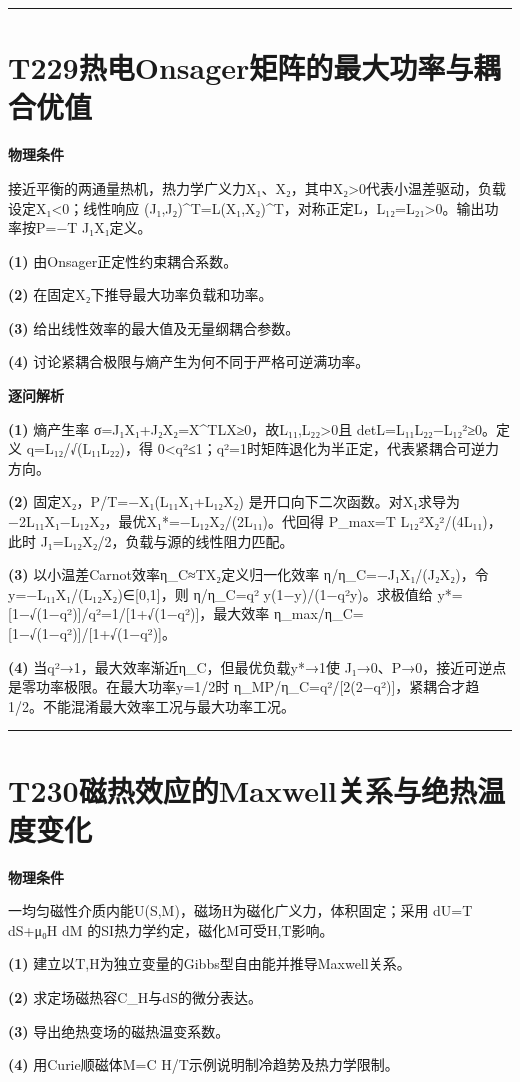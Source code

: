 \documentclass[UTF8,a4paper,11pt,oneside,openany]{ctexbook}
\begin{document}
\par\bigskip\hrule\bigskip
\section*{T229\quad 热电Onsager矩阵的最大功率与耦合优值}
\textbf{物理条件}\par 接近平衡的两通量热机，热力学广义力X₁、X₂，其中X₂>0代表小温差驱动，负载设定X₁<0；线性响应 (J₁,J₂)\textasciicircum{}T=L(X₁,X₂)\textasciicircum{}T，对称正定L，L₁₂=L₂₁>0。输出功率按P=−T J₁X₁定义。
\par\noindent\textbf{(1)} 由Onsager正定性约束耦合系数。
\par\noindent\textbf{(2)} 在固定X₂下推导最大功率负载和功率。
\par\noindent\textbf{(3)} 给出线性效率的最大值及无量纲耦合参数。
\par\noindent\textbf{(4)} 讨论紧耦合极限与熵产生为何不同于严格可逆满功率。

\par\medskip\noindent\textbf{逐问解析}
\par\noindent\textbf{(1)} 熵产生率 σ=J₁X₁+J₂X₂=X\textasciicircum{}TLX≥0，故L₁₁,L₂₂>0且 detL=L₁₁L₂₂−L₁₂²≥0。定义 q=L₁₂/√(L₁₁L₂₂)，得 0<q²≤1；q²=1时矩阵退化为半正定，代表紧耦合可逆力方向。
\par\noindent\textbf{(2)} 固定X₂，P/T=−X₁(L₁₁X₁+L₁₂X₂) 是开口向下二次函数。对X₁求导为−2L₁₁X₁−L₁₂X₂，最优X₁*=−L₁₂X₂/(2L₁₁)。代回得 P\_max=T L₁₂²X₂²/(4L₁₁)，此时 J₁=L₁₂X₂/2，负载与源的线性阻力匹配。
\par\noindent\textbf{(3)} 以小温差Carnot效率η\_C≈TX₂定义归一化效率 η/η\_C=−J₁X₁/(J₂X₂)，令 y=−L₁₁X₁/(L₁₂X₂)∈[0,1]，则 η/η\_C=q² y(1−y)/(1−q²y)。求极值给 y*=[1−√(1−q²)]/q²=1/[1+√(1−q²)]，最大效率 η\_max/η\_C=[1−√(1−q²)]/[1+√(1−q²)]。
\par\noindent\textbf{(4)} 当q²→1，最大效率渐近η\_C，但最优负载y*→1使 J₁→0、P→0，接近可逆点是零功率极限。在最大功率y=1/2时 η\_MP/η\_C=q²/[2(2−q²)]，紧耦合才趋1/2。不能混淆最大效率工况与最大功率工况。

\par\bigskip\hrule\bigskip
\section*{T230\quad 磁热效应的Maxwell关系与绝热温度变化}
\textbf{物理条件}\par 一均匀磁性介质内能U(S,M)，磁场H为磁化广义力，体积固定；采用 dU=T dS+μ₀H dM 的SI热力学约定，磁化M可受H,T影响。
\par\noindent\textbf{(1)} 建立以T,H为独立变量的Gibbs型自由能并推导Maxwell关系。
\par\noindent\textbf{(2)} 求定场磁热容C\_H与dS的微分表达。
\par\noindent\textbf{(3)} 导出绝热变场的磁热温变系数。
\par\noindent\textbf{(4)} 用Curie顺磁体M=C H/T示例说明制冷趋势及热力学限制。
\end{document}
